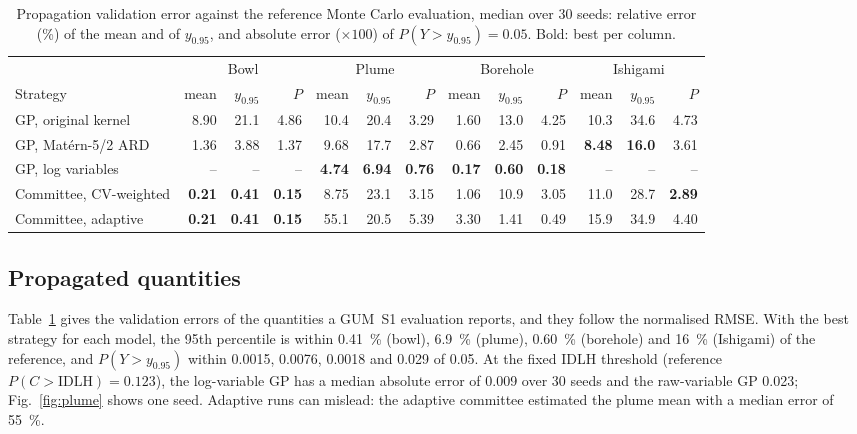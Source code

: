 \documentclass{imeko_wc}
\begin{document}
\begin{table}[tb]
\centering
\caption{Propagation validation error against the reference Monte Carlo
evaluation, median over 30 seeds: relative error (\%) of the mean and of
$y_{0.95}$, and absolute error ($\times100$) of $P(Y>y_{0.95})=0.05$. Bold:
best per column.}
\label{tab:prop}
\begin{tabular}{l rrr rrr rrr rrr}
\toprule
& \multicolumn{3}{c}{Bowl} & \multicolumn{3}{c}{Plume} &
\multicolumn{3}{c}{Borehole} & \multicolumn{3}{c}{Ishigami}\\
\cmidrule(lr){2-4}\cmidrule(lr){5-7}\cmidrule(lr){8-10}\cmidrule(lr){11-13}
Strategy & mean & $y_{0.95}$ & $P$ & mean & $y_{0.95}$ & $P$ &
mean & $y_{0.95}$ & $P$ & mean & $y_{0.95}$ & $P$\\
\midrule
GP, original kernel & 8.90 & 21.1 & 4.86 & 10.4 & 20.4 & 3.29 & 1.60 & 13.0 & 4.25 & 10.3 & 34.6 & 4.73 \\
GP, Mat\'ern-5/2 ARD & 1.36 & 3.88 & 1.37 & 9.68 & 17.7 & 2.87 & 0.66 & 2.45 & 0.91 & \textbf{8.48} & \textbf{16.0} & 3.61 \\
GP, log variables & -- & -- & -- & \textbf{4.74} & \textbf{6.94} & \textbf{0.76} & \textbf{0.17} & \textbf{0.60} & \textbf{0.18} & -- & -- & -- \\
Committee, CV-weighted & \textbf{0.21} & \textbf{0.41} & \textbf{0.15} & 8.75 & 23.1 & 3.15 & 1.06 & 10.9 & 3.05 & 11.0 & 28.7 & \textbf{2.89} \\
Committee, adaptive & \textbf{0.21} & \textbf{0.41} & \textbf{0.15} & 55.1 & 20.5 & 5.39 & 3.30 & 1.41 & 0.49 & 15.9 & 34.9 & 4.40 \\
\bottomrule
\end{tabular}
\end{table}

\subsection{Propagated quantities}
Table~\ref{tab:prop} gives the validation errors of the quantities a GUM~S1
evaluation reports, and they follow the normalised RMSE. With the best
strategy for each model, the 95th percentile is within \qty{0.41}{\percent}
(bowl), \qty{6.9}{\percent} (plume), \qty{0.60}{\percent} (borehole) and
\qty{16}{\percent} (Ishigami) of the reference, and $P(Y>y_{0.95})$ within
0.0015, 0.0076, 0.0018 and 0.029 of 0.05. At the fixed IDLH threshold
(reference $P(C>\mathrm{IDLH})=0.123$), the log-variable GP has a median
absolute error of 0.009 over 30 seeds and the raw-variable GP 0.023;
Fig.~\ref{fig:plume} shows one seed. Adaptive runs can mislead: the adaptive
committee estimated the plume mean with a median error of
\qty{55}{\percent}.
\end{document}
